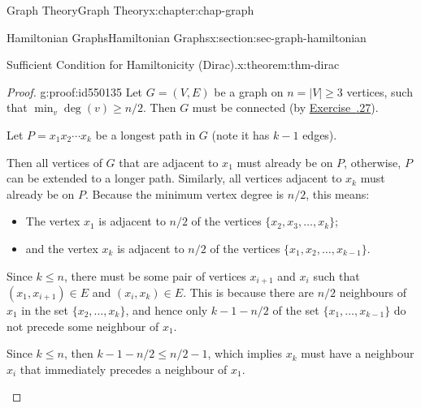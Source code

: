 \documentclass[oneside,10pt,]{book}
\newcommand{\xreffont}{\relax}
\numberwithin{equation}{section}
\begin{document}
\begin{chapterptx}{Graph Theory}{}{Graph Theory}{}{}{x:chapter:chap-graph}
\begin{sectionptx}{Hamiltonian Graphs}{}{Hamiltonian Graphs}{}{}{x:section:sec-graph-hamiltonian}
\begin{theorem}{Sufficient Condition for Hamiltonicity (Dirac).}{}{x:theorem:thm-dirac}
\end{theorem}
\begin{proof}{}{g:proof:id550135}
Let \(G = (V,E)\) be a graph on \(n = |V| \geq 3\) vertices, such that \(\min_v \deg(v) \geq n/2\). Then \(G\) must be connected (by \hyperlink{x:exercise:ex-deg-connected}{Exercise~{\xreffont 5.8.27}}).%
\par
Let \(P = x_1x_2\cdots x_k\) be a longest path in \(G\) (note it has \(k-1\) edges).%
\par
Then all vertices of \(G\) that are adjacent to \(x_1\) must already be on \(P\), otherwise, \(P\) can be extended to a longer path. Similarly, all vertices adjacent to \(x_k\) must already be on \(P\). Because the minimum vertex degree is \(n/2\), this means:%
\begin{itemize}[label=\textbullet]
\item{}The vertex \(x_1\) is adjacent to \(n/2\) of the vertices \(\{x_2,x_3,\ldots,x_k\}\);%
\item{}and the vertex \(x_k\) is adjacent to \(n/2\) of the vertices \(\{x_1,x_2,\ldots,x_{k-1}\}\).%
\end{itemize}
%
\par
Since \(k \leq n\), there must be some pair of vertices \(x_{i+1}\) and \(x_i\) such that \((x_1,x_{i+1}) \in E\) and \((x_i,x_k) \in E\). This is because there are \(n/2\) neighbours of \(x_1\) in the set \(\{x_2,\ldots,x_k\}\), and hence only \(k - 1 - n/2\) of the set \(\{x_1,\ldots,x_{k-1}\}\) do not precede some neighbour of \(x_1\).%
\par
Since \(k \leq n\), then \(k - 1 - n/2 \leq n/2-1\), which implies \(x_k\) must have a neighbour \(x_i\) that immediately precedes a neighbour of \(x_{1}\).%
\begin{sidebyside}{1}{0.2}{0.2}{0}%
\begin{sbspanel}{0.6}%
\end{sbspanel}
\end{sidebyside}
\end{proof}
\end{sectionptx}
\end{chapterptx}
\end{document}
